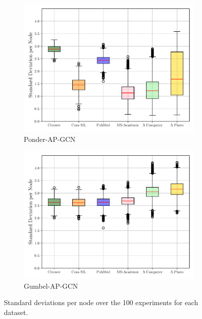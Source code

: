 \documentclass{gdl}
\begin{document}
\begin{figure}[p]
\begin{minipage}[t]{0.48\textwidth}
        \begin{subfigure}[b]{0.8\textwidth}
            \centering
            \includegraphics[width=\textwidth]{Ponder-AP-GCN_std_steps_per_node_boxplot.pdf}
            \captionsetup{justification=centerlast}
            \caption{Ponder-AP-GCN}
            \label{fig:step_std_Ponder_AP_GCN}
        \end{subfigure}
        
        \begin{subfigure}[b]{0.8\textwidth}
            \centering
            \includegraphics[width=\textwidth]{Gumbel-AP-GCN_std_steps_per_node_boxplot.pdf}
            \captionsetup{justification=centerlast}
            \caption{Gumbel-AP-GCN}
            \label{fig:step_std_Gumbel_AP_GCN}
        \end{subfigure}

        
        \captionsetup{justification=centerlast}
        \caption{Standard deviations per node over the 100 experiments for each dataset.}
        \label{fig:steps-dist-steps-std}
    \end{minipage}
\end{figure}
\end{document}
